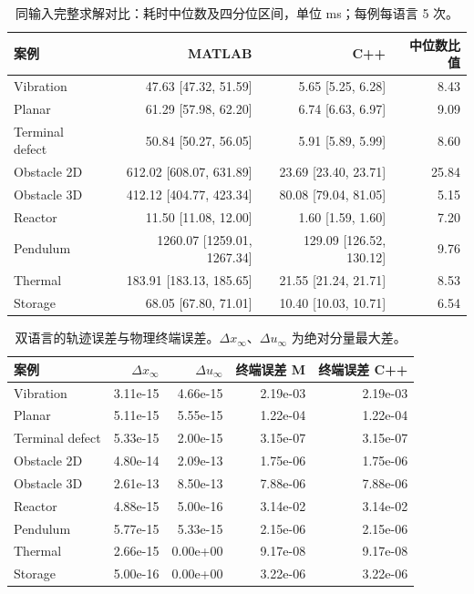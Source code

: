 \begin{table}[H]\centering\small
\caption{同输入完整求解对比：耗时中位数及四分位区间，单位 ms；每例每语言 5 次。}
\begin{tabular}{lrrr}\toprule
案例 & MATLAB & C++ & 中位数比值\\\midrule
Vibration & 47.63 [47.32, 51.59] & 5.65 [5.25, 6.28] & 8.43\\
Planar & 61.29 [57.98, 62.20] & 6.74 [6.63, 6.97] & 9.09\\
Terminal defect & 50.84 [50.27, 56.05] & 5.91 [5.89, 5.99] & 8.60\\
Obstacle 2D & 612.02 [608.07, 631.89] & 23.69 [23.40, 23.71] & 25.84\\
Obstacle 3D & 412.12 [404.77, 423.34] & 80.08 [79.04, 81.05] & 5.15\\
Reactor & 11.50 [11.08, 12.00] & 1.60 [1.59, 1.60] & 7.20\\
Pendulum & 1260.07 [1259.01, 1267.34] & 129.09 [126.52, 130.12] & 9.76\\
Thermal & 183.91 [183.13, 185.65] & 21.55 [21.24, 21.71] & 8.53\\
Storage & 68.05 [67.80, 71.01] & 10.40 [10.03, 10.71] & 6.54\\
\bottomrule\end{tabular}\end{table}
\begin{table}[H]\centering\small
\caption{双语言的轨迹误差与物理终端误差。$\Delta x_\infty$、$\Delta u_\infty$ 为绝对分量最大差。}
\begin{tabular}{lrrrr}\toprule
案例 & $\Delta x_\infty$ & $\Delta u_\infty$ & 终端误差 M & 终端误差 C++\\\midrule
Vibration & 3.11e-15 & 4.66e-15 & 2.19e-03 & 2.19e-03\\
Planar & 5.11e-15 & 5.55e-15 & 1.22e-04 & 1.22e-04\\
Terminal defect & 5.33e-15 & 2.00e-15 & 3.15e-07 & 3.15e-07\\
Obstacle 2D & 4.80e-14 & 2.09e-13 & 1.75e-06 & 1.75e-06\\
Obstacle 3D & 2.61e-13 & 8.50e-13 & 7.88e-06 & 7.88e-06\\
Reactor & 4.88e-15 & 5.00e-16 & 3.14e-02 & 3.14e-02\\
Pendulum & 5.77e-15 & 5.33e-15 & 2.15e-06 & 2.15e-06\\
Thermal & 2.66e-15 & 0.00e+00 & 9.17e-08 & 9.17e-08\\
Storage & 5.00e-16 & 0.00e+00 & 3.22e-06 & 3.22e-06\\
\bottomrule\end{tabular}\end{table}
